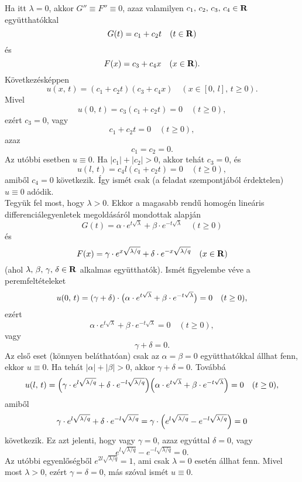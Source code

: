 Ha itt $\lambda = 0$, akkor $G'' \equiv F'' \equiv 0$, azaz valamilyen $c_1, \, c_2, \, c_3, \, c_4 \in \mathbf{R}$ együtthatókkal
\[
	G(t) = c_1 + c_2 t \quad (t \in \mathbf{R})
\]
és
\[
	F(x) = c_3 + c_4 x \quad (x \in \mathbf{R}).
\]
Következésképpen
\[
	u(x, \, t) = (c_1 + c_2t)(c_3 + c_4 x) \quad (x \in [0, \, l], \, t \geq 0).
\]
Mivel
\[
	u(0, \, t) = c_3(c_1 + c_2 t) = 0 \quad (t \geq 0),
\]
ezért $c_3 = 0$, vagy
\[
	c_1 + c_2t = 0 \quad (t \geq 0),
\]
azaz
\[
	c_1 = c_2 = 0.
\]
Az utóbbi esetben $u \equiv 0$. Ha $|c_1| + |c_2| > 0$, akkor tehát $c_3 = 0$, és
\[
	u(l, \, t) = c_4l(c_1 + c_2t)  = 0 \quad (t \geq 0),
\]
amiből $c_4 = 0$ következik. Így ismét csak (a feladat szempontjából érdektelen) $u \equiv 0$ adódik.\\

Tegyük fel most, hogy $\lambda > 0$. Ekkor a magasabb rendű homogén lineáris differenciálegyenletek megoldásáról mondottak alapján
\[
	G(t) = \alpha \cdot e^{t \sqrt{\lambda}} + \beta \cdot e^{-t \sqrt{\lambda}} \quad (t \geq 0)
\]
és
\[
	F(x) = \gamma \cdot e^{x \sqrt{\lambda / q}} + \delta \cdot e^{-x \sqrt{\lambda / q}} \quad (x \in \mathbf{R})
\]
(ahol $\lambda, \, \beta, \, \gamma, \, \delta \in \mathbf{R}$ alkalmas együtthatók). Ismét figyelembe véve a peremfeltételeket
\[
	u(0, \, t) = (\gamma + \delta) \cdot \big(  \alpha \cdot e^{t \sqrt{\lambda}} + \beta \cdot e ^{- t \sqrt{\lambda}}  \big) = 0 \quad (t \geq 0),
\]
ezért
\[
	\alpha  \cdot e^{t \sqrt{\lambda}} + \beta \cdot e^{-t \sqrt{\lambda}} = 0 \quad (t \geq 0),
\]
vagy
\[
	\gamma + \delta = 0.
\]
Az első eset (könnyen beláthatóan) csak az $\alpha = \beta = 0$ együtthatókkal állhat fenn, ekkor $u \equiv 0$. Ha tehát $|\alpha| + |\beta| > 0$, akkor $\gamma + \delta = 0$. Továbbá
\[
	u(l, \, t) = \Big(  \gamma \cdot e^{l \sqrt{\lambda / q}} + \delta \cdot e^{-l \sqrt{\lambda / q}} \Big) \Big(  \alpha \cdot e^{t \sqrt{\lambda}} + \beta \cdot e^{-t \sqrt{\lambda}}  \Big) = 0 \quad (t \geq 0),
\]
amiből
\[
	\gamma \cdot e^{l \sqrt{\lambda / q}} + \delta \cdot e^{-l \sqrt{\lambda / q}} = \gamma \cdot \Big(  e^{l \sqrt{\lambda / q}} - e^{-l \sqrt{\lambda / q}} \Big) = 0
\]
következik. Ez azt jelenti, hogy vagy $\gamma = 0$, azaz egyúttal $\delta = 0$, vagy
\[
	e^{l \sqrt{\lambda / q}} - e^{-l \sqrt{\lambda / q}} = 0.
\]
Az utóbbi egyenlőségből $e^{2l \sqrt{\lambda / q}} = 1$, ami csak $\lambda = 0$ esetén állhat fenn. Mivel most $\lambda > 0$, ezért $\gamma = \delta = 0$, más szóval ismét $u \equiv 0$.\\

